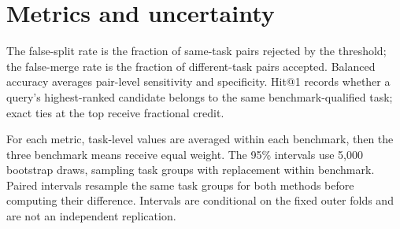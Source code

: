 \section{Metrics and uncertainty}

The false-split rate is the fraction of same-task pairs rejected by the threshold; the false-merge rate is the fraction of different-task pairs accepted. Balanced accuracy averages pair-level sensitivity and specificity. Hit@1 records whether a query's highest-ranked candidate belongs to the same benchmark-qualified task; exact ties at the top receive fractional credit.

For each metric, task-level values are averaged within each benchmark, then the three benchmark means receive equal weight. The 95\% intervals use 5,000 bootstrap draws, sampling task groups with replacement within benchmark. Paired intervals resample the same task groups for both methods before computing their difference. Intervals are conditional on the fixed outer folds and are not an independent replication.
